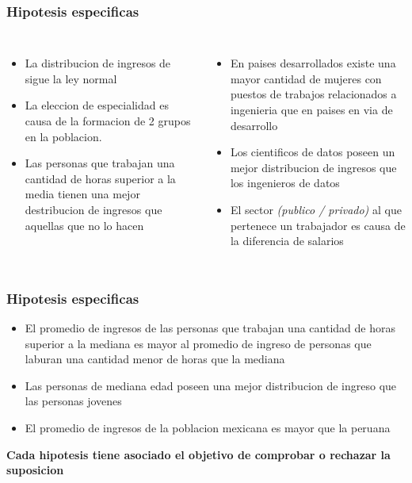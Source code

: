 \documentclass{beamer}
\begin{document}
\begin{frame}
\frametitle{Hipotesis especificas}

\begin{columns}

  \begin{itemize}
      \item La distribucion de ingresos de  sigue
        la ley normal
      \item La eleccion de especialidad es causa de la formacion de 2 grupos
        en la poblacion.
      \item Las personas que trabajan una cantidad de horas superior a
        la media tienen una mejor destribucion de ingresos que aquellas
        que no lo hacen
  \end{itemize}


  \begin{itemize}
      \item En paises desarrollados existe una mayor cantidad
        de mujeres con puestos de trabajos relacionados a ingenieria que en paises en via
        de desarrollo
      \item Los cientificos de datos poseen un mejor distribucion de ingresos
        que los ingenieros de datos
      \item El sector \textit{(publico / privado)} al que pertenece un trabajador
        es causa de la diferencia de salarios
  \end{itemize}
\end{columns}
\end{frame}


\begin{frame}
\frametitle{Hipotesis especificas}
  \begin{itemize}
      \item El \alert{promedio de ingresos} de las personas que trabajan
        una cantidad de horas superior a la mediana es mayor al promedio
        de ingreso de personas que laburan una cantidad menor de horas
        que la mediana
      \item Las personas de mediana edad poseen una mejor distribucion
        de ingreso que las personas jovenes
      \item El promedio de ingresos de la poblacion mexicana es mayor
        que la peruana
  \end{itemize}

  \textbf{Cada hipotesis tiene asociado el objetivo de comprobar
  o rechazar la suposicion}

\end{frame}
\end{document}

